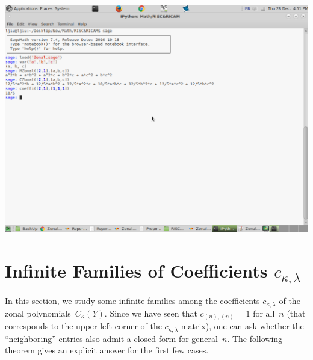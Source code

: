 \documentclass[10pt,oneside,american]{amsart}
\numberwithin{equation}{section}
\numberwithin{figure}{section}
\theoremstyle{definition}
\theoremstyle{remark}
\theoremstyle{plain}
\theoremstyle{definition}
\theoremstyle{plain}
\theoremstyle{plain}
\theoremstyle{plain}
\begin{document}
\includegraphics[scale=0.3]{ScreenShot}


\section{Infinite Families of Coefficients $c_{\kappa,\lambda}$}

In this section, we study some infinite families among the coefficients
$c_{\kappa,\lambda}$ of the zonal polynomials~$C_{\kappa}(Y)$. Since we have
seen that $c_{(n),(n)}=1$ for all~$n$ (that corresponds to the upper left
corner of the $c_{\kappa,\lambda}$-matrix), one can ask whether the
``neighboring'' entries also admit a closed form for general~$n$.  The
following theorem gives an explicit answer for the first few cases.
\end{document}

